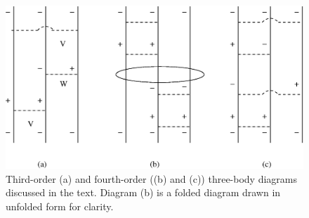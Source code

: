 \documentclass[prc,aps,amsmath,amssymb,preprintnumbers,showpacs,twocolumn]{revtex4}
\begin{document}
%
\begin{figure}[t]
 \includegraphics[width=8truecm]{fig3.eps}
\caption{Third-order (a) and fourth-order ((b) and (c)) three-body 
diagrams discussed in the text. Diagram (b) is a folded diagram drawn
in unfolded form for clarity.} \label{f3}
\end{figure}
%
\end{document}
